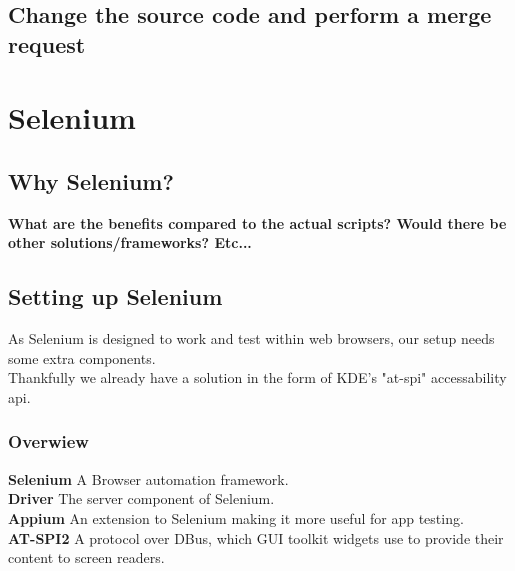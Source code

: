 \documentclass{article}
\begin{document}
        \subsection{Change the source code and perform a merge request}

    \newpage
    \section{Selenium}
        \subsection{Why Selenium?}
        \textbf{What are the benefits compared to the actual scripts? 
        Would there be other solutions/frameworks? Etc...}

        \subsection{Setting up Selenium}
        As Selenium is designed to work and test within web browsers, our setup 
        needs some extra components.\\
        Thankfully we already have a solution in the form of KDE's "at-spi" 
        accessability api.

        \subsubsection{Overwiew}
        \textbf{Selenium} A Browser automation framework.\\
        \textbf{Driver} The server component of Selenium.\\
        \textbf{Appium} An extension to Selenium making it more useful for app 
        testing.\\
        \textbf{AT-SPI2} A protocol over DBus, which GUI toolkit widgets use to 
        provide their content to screen readers.\\
\end{document}
